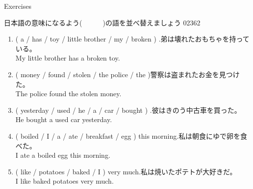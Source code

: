 \documentclass[aspectratio=169,xcolor={dvipsnames,table}]{beamer}
\begin{document}
\begin{frame}[plain,t]{Exercises}
 
{\small 日本語の意味になるよう(~~~~~~)の語を並べ替えましょう}%
\hfill{\tiny 02362}\,{\scriptsize {}}
 
\begin{enumerate}
 \item  ( a / has / toy / little brother / my / broken ) .\hfill{\small 弟は壊れたおもちゃを持っている。}\\
My little brother has a broken toy.
 \item  ( money / found / stolen / the police / the )\hfill{\small 警察は盗まれたお金を見つけた。}\\
The police found the stolen money.
 \item  ( yesterday / used / he / a / car / bought ) .\hfill{\small 彼はきのう中古車を買った。}\\
He bought a used car yesterday.
 \item  ( boiled / I / a / ate / breakfast / egg ) this morning.\hfill{\small 私は朝食にゆで卵を食べた。}\\
I ate a boiled egg this morning.
 \item  ( like / potatoes / baked / I  ) very much.\hfill{\small 私は焼いたポテトが大好きだ。}\\
I like baked potatoes very much.
\end{enumerate}
\end{frame}
\end{document}
